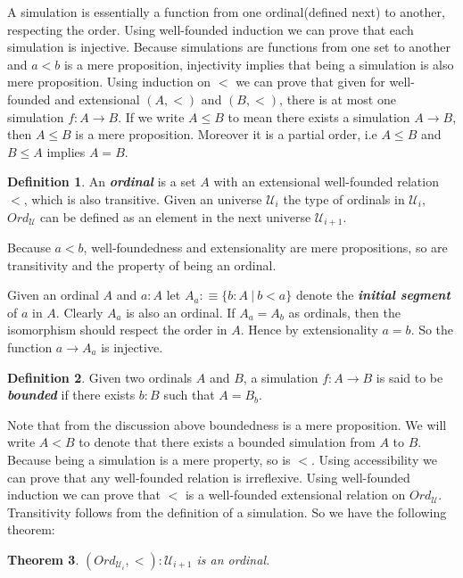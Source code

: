 \documentclass[10pt]{article}
\theoremstyle{definition}
\newtheorem{definition}{Definition}[section]
\theoremstyle{plain}
\newtheorem{theorem}[definition]{Theorem}
\theoremstyle{remark}
\newcommand{\U}{\mathscr{U}}
\begin{document}
A simulation is essentially a function from one ordinal(defined next) to another, 
respecting the order. Using well-founded induction we can prove that each simulation is 
injective. Because simulations are functions from one set to another and $a<b$ is a mere 
proposition, injectivity implies that being a simulation is also mere proposition. Using 
induction on $<$ we can prove that given for well-founded and extensional $(A,<)$ and $(B,<)$, 
there is at most one simulation $f:A \to B$. If we write $A \leq B$ to mean there exists a 
simulation $A \to B$, then $A \leq B$ is a mere proposition. Moreover it is a partial order, 
i.e $A \leq B$ and $B \leq A$ implies $A = B$. 

\begin{definition}\label{D:Ordinal}
An \textbf{\textit{ordinal}} is a set $A$ with an extensional well-founded relation $<$, which
is also transitive. Given an universe $\U_i$ the type of ordinals in $\U_{i}$, ${Ord}_{\U}$
can be defined as an element in the next universe $\U_{i+1}$.
\end{definition}

Because $a < b$, well-foundedness and extensionality are mere propositions, so are
transitivity and the property of being an ordinal.\smallskip

Given an ordinal $A$ and $a : A$ let $A_a :\equiv \{ b : A\ |\ b < a\}$ denote the 
\textbf{\textit{initial segment}} of $a$ in $A$. Clearly $A_a$ is also an ordinal. If 
$A_a = A_b$ as ordinals, then the isomorphism should respect the order in $A$. Hence by 
extensionality $a = b$. So the function $a \to A_a$ is injective. 

\begin{definition}\label{D:Bdd sim}
Given two ordinals $A$ and $B$, a simulation $f : A \to B$ is said to be 
\textbf{\textit{bounded}} if there exists $b : B$ such that $A = B_b$. 
\end{definition}

Note that from the discussion above boundedness is a mere proposition. We will write 
$A < B$ to denote that there exists a bounded simulation from $A$ to $B$. Because being a 
simulation is a mere property, so is $<$. Using accessibility we can prove that any 
well-founded relation is irreflexive. Using well-founded induction we can prove that $<$
is a well-founded extensional relation on ${Ord}_{\U}$. Transitivity follows from 
the definition of a simulation. So we have the following theorem:
\begin{theorem}
$({Ord}_{\U_i},<) : \U_{i+1}$ is an ordinal.
\end{theorem}
\end{document}
